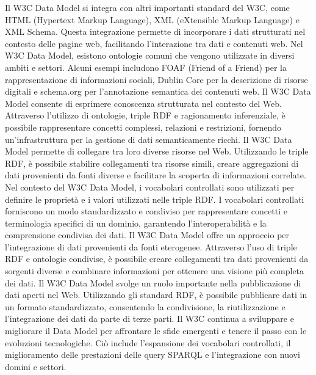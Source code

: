 Il W3C Data Model si integra con altri importanti standard del W3C, come HTML (Hypertext Markup Language), XML (eXtensible Markup Language) e XML Schema. Questa integrazione permette di incorporare i dati strutturati nel contesto delle pagine web, facilitando l'interazione tra dati e contenuti web.
Nel W3C Data Model, esistono ontologie comuni che vengono utilizzate in diversi ambiti e settori. Alcuni esempi includono FOAF (Friend of a Friend) per la rappresentazione di informazioni sociali, Dublin Core per la descrizione di risorse digitali e schema.org per l'annotazione semantica dei contenuti web.
Il W3C Data Model consente di esprimere conoscenza strutturata nel contesto del Web. Attraverso l'utilizzo di ontologie, triple RDF e ragionamento inferenziale, è possibile rappresentare concetti complessi, relazioni e restrizioni, fornendo un'infrastruttura per la gestione di dati semanticamente ricchi.
Il W3C Data Model permette di collegare tra loro diverse risorse nel Web. Utilizzando le triple RDF, è possibile stabilire collegamenti tra risorse simili, creare aggregazioni di dati provenienti da fonti diverse e facilitare la scoperta di informazioni correlate.
Nel contesto del W3C Data Model, i vocabolari controllati sono utilizzati per definire le proprietà e i valori utilizzati nelle triple RDF. I vocabolari controllati forniscono un modo standardizzato e condiviso per rappresentare concetti e terminologia specifici di un dominio, garantendo l'interoperabilità e la comprensione condivisa dei dati.
Il W3C Data Model offre un approccio per l'integrazione di dati provenienti da fonti eterogenee. Attraverso l'uso di triple RDF e ontologie condivise, è possibile creare collegamenti tra dati provenienti da sorgenti diverse e combinare informazioni per ottenere una visione più completa dei dati.
Il W3C Data Model svolge un ruolo importante nella pubblicazione di dati aperti nel Web. Utilizzando gli standard RDF, è possibile pubblicare dati in un formato standardizzato, consentendo la condivisione, la riutilizzazione e l'integrazione dei dati da parte di terze parti.
Il W3C continua a sviluppare e migliorare il Data Model per affrontare le sfide emergenti e tenere il passo con le evoluzioni tecnologiche. Ciò include l'espansione dei vocabolari controllati, il miglioramento delle prestazioni delle query SPARQL e l'integrazione con nuovi domini e settori.\\

